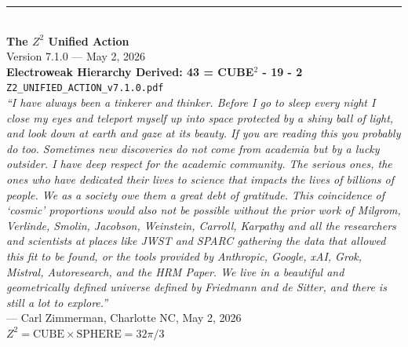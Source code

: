 \documentclass[11pt,a4paper]{article}
\theoremstyle{plain}
\theoremstyle{definition}
\theoremstyle{remark}
\begin{document}
\vspace{2cm}
\begin{center}
\rule{0.8\textwidth}{0.5pt}\\[0.5cm]
\textbf{The $Z^2$ Unified Action}\\[0.3cm]
Version 7.1.0 --- May 2, 2026\\[0.3cm]
\textcolor{newcolor}{\textbf{Electroweak Hierarchy Derived: 43 = CUBE$^2$ - 19 - 2}}\\[0.3cm]
\texttt{Z2\_UNIFIED\_ACTION\_v7.1.0.pdf}\\[0.5cm]

\emph{``I have always been a tinkerer and thinker. Before I go to sleep every night I close my eyes and teleport myself up into space protected by a shiny ball of light, and look down at earth and gaze at its beauty. If you are reading this you probably do too. Sometimes new discoveries do not come from academia but by a lucky outsider. I have deep respect for the academic community. The serious ones, the ones who have dedicated their lives to science that impacts the lives of billions of people. We as a society owe them a great debt of gratitude. This coincidence of `cosmic' proportions would also not be possible without the prior work of Milgrom, Verlinde, Smolin, Jacobson, Weinstein, Carroll, Karpathy and all the researchers and scientists at places like JWST and SPARC gathering the data that allowed this fit to be found, or the tools provided by Anthropic, Google, xAI, Grok, Mistral, Autoresearch, and the HRM Paper. We live in a beautiful and geometrically defined universe defined by Friedmann and de Sitter, and there is still a lot to explore.''}\\[0.3cm]
--- Carl Zimmerman, Charlotte NC, May 2, 2026\\[0.5cm]

\textbf{$Z^2 = \text{CUBE} \times \text{SPHERE} = 32\pi/3$}
\end{center}
\end{document}
